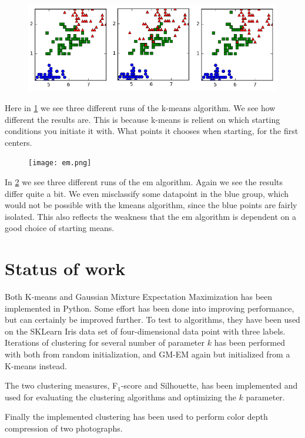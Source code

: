 \documentclass[a4paper,10pt,article,oneside,english]{memoir}
\let\oldcaption\caption
\renewcommand{\caption}[1]{\oldcaption{\emph{#1}}}
\begin{document}
\begin{figure}
	\centering
	\includegraphics[width=\textwidth]{kmeans1.png}
	\caption{}
	\label{fig:km}
\end{figure}
Here in \ref{fig:km} we see three different runs of the k-means algorithm. We see how different the results are. This is because k-means is relient on which starting conditions you initiate it with. What points it chooses when starting, for the first centers.
\begin{figure}
	\centering
	\texttt{[image: em.png]}
	\caption{}
	\label{fig:em}
\end{figure}
In \ref{fig:em} we see three different runs of the em algorithm. Again we see the results differ quite a bit. We even misclassify some datapoint in the blue group, which would not be possible with the kmeans algorithm, since the blue points are fairly isolated. This also reflects the weakness that the em algorithm is dependent on a good choice of starting means.

\section*{Status of work}
Both K-means and Gaussian Mixture Expectation Maximization has been implemented in Python. Some effort has been done into improving performance, but can certainly be improved further. To test to algorithms, they have been used on the SKLearn Iris data set of four-dimensional data point with three labels. Iterations of clustering for several number of parameter $k$ has been performed with both from random initialization, and GM-EM again but initialized from a K-means instead. 

The two clustering measures, F$_1$-score and Silhouette, has been implemented and used for evaluating the clustering algorithms and optimizing the $k$ parameter. 

Finally the implemented clustering has been used to perform color depth compression of two photographs. 
\end{document}
